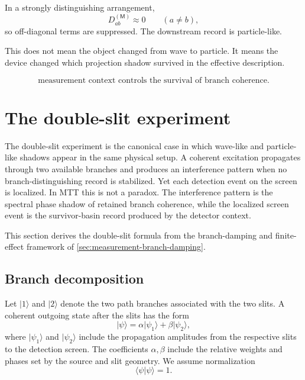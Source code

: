 \documentclass[11pt]{article}
\newcommand{\Meas}{\mathsf M}
\begin{document}
In a strongly distinguishing arrangement,
\begin{equation}
  D_{ab}^{(\Meas)}\approx0
  \qquad
  (a\neq b),
\end{equation}
so off-diagonal terms are suppressed. The downstream record is particle-like.

This does not mean the object changed from wave to particle. It means the device changed
which projection shadow survived in the effective description.

\begin{equation}
  \boxed{
  \text{measurement context controls the survival of branch coherence}.
  }
\end{equation}


\section{The double-slit experiment}
\label{sec:double-slit}

The double-slit experiment is the canonical case in which wave-like and particle-like shadows
appear in the same physical setup. A coherent excitation propagates through two available
branches and produces an interference pattern when no branch-distinguishing record is
stabilized. Yet each detection event on the screen is localized. In MTT this is not a paradox.
The interference pattern is the spectral phase shadow of retained branch coherence, while the
localized screen event is the survivor-basin record produced by the detector context.

This section derives the double-slit formula from the branch-damping and finite-effect
framework of \cref{sec:measurement-branch-damping}.

\subsection{Branch decomposition}
\label{subsec:double-slit-branch-decomposition}

Let \(|1\rangle\) and \(|2\rangle\) denote the two path branches associated with the two slits.
A coherent outgoing state after the slits has the form
\begin{equation}
  |\psi\rangle
  =
  \alpha|\psi_1\rangle+\beta|\psi_2\rangle,
  \label{eq:double-slit-state}
\end{equation}
where \(|\psi_1\rangle\) and \(|\psi_2\rangle\) include the propagation amplitudes from the
respective slits to the detection screen. The coefficients \(\alpha,\beta\) include the relative
weights and phases set by the source and slit geometry. We assume normalization
\begin{equation}
  \langle\psi|\psi\rangle=1.
\end{equation}
\end{document}
